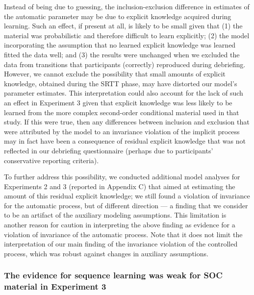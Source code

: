 \documentclass[floatsintext,doc]{apa6}
\theoremstyle{definition}
\theoremstyle{definition}
\theoremstyle{definition}
\theoremstyle{remark}
\begin{document}
Instead of being due to guessing, the inclusion-exclusion difference in
estimates of the automatic parameter may be due to explicit knowledge
acquired during learning. Such an effect, if present at all, is likely
to be small given that (1) the material was probabilistic and therefore
difficult to learn explicitly; (2) the model incorporating the
assumption that no learned explicit knowledge was learned fitted the
data well; and (3) the results were unchanged when we excluded the data
from transitions that participants (correctly) reproduced during
debriefing. However, we cannot exclude the possibility that small
amounts of explicit knowledge, obtained during the SRTT phase, may have
distorted our model's parameter estimates. This interpretation could
also account for the lack of such an effect in Experiment 3 given that
explicit knowledge was less likely to be learned from the more complex
second-order conditional material used in that study. If this were true,
then any differences between inclusion and exclusion that were
attributed by the model to an invariance violation of the implicit
process may in fact have been a consequence of residual explicit
knowledge that was not reflected in our debriefing questionnaire
(perhaps due to participants' conservative reporting criteria).

To further address this possibility, we conducted additional model
analyses for Experiments 2 and 3 (reported in Appendix C) that aimed at
estimating the amount of this residual explicit knowledge; we still
found a violation of invariance for the automatic process, but of
different direction --- a finding that we consider to be an artifact of
the auxiliary modeling assumptions. This limitation is another reason
for caution in interpreting the above finding as evidence for a
violation of invariance of the automatic process. Note that it does not
limit the interpretation of our main finding of the invariance violation
of the controlled process, which was robust against changes in auxiliary
assumptions.

\subsubsection{The evidence for sequence learning was weak for SOC
material in Experiment
3}\label{the-evidence-for-sequence-learning-was-weak-for-soc-material-in-experiment-3}
\end{document}
